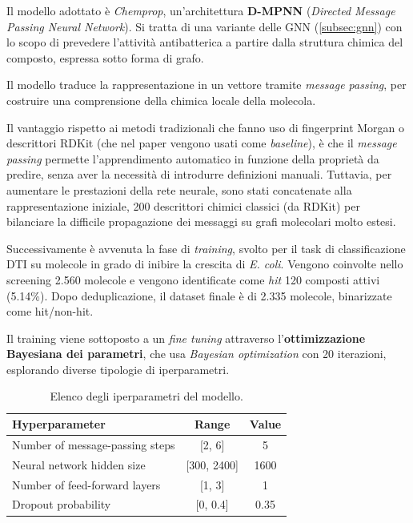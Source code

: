 Il modello adottato è \textit{Chemprop}, un'architettura \textbf{D-MPNN} (\textit{Directed Message Passing Neural Network}). Si tratta di una variante delle GNN (\ref{subsec:gnn}) con lo scopo di prevedere l'attività antibatterica a partire dalla struttura chimica del composto, espressa sotto forma di grafo.

Il modello traduce la rappresentazione in un vettore tramite \textit{message passing}, per costruire una comprensione della chimica locale della molecola.

Il vantaggio rispetto ai metodi tradizionali che fanno uso di fingerprint Morgan o descrittori RDKit (che nel paper vengono usati come \textit{baseline}), è che il \textit{message passing} permette l'apprendimento automatico in funzione della proprietà da predire, senza aver la necessità di introdurre definizioni manuali.
Tuttavia, per aumentare le prestazioni della rete neurale, sono stati concatenate alla rappresentazione iniziale, 200 descrittori chimici classici (da RDKit) per bilanciare la difficile propagazione dei messaggi su grafi molecolari molto estesi.

Successivamente è avvenuta la fase di \textit{training}, svolto per il task di classificazione DTI su molecole in grado di inibire la crescita di \textit{E. coli}. Vengono coinvolte nello screening 2.560 molecole e vengono identificate come \textit{hit} 120 composti attivi (5.14\%).
Dopo deduplicazione, il dataset finale è di 2.335 molecole, binarizzate come hit/non-hit.

Il training viene sottoposto a un \textit{fine tuning} attraverso l'\textbf{ottimizzazione Bayesiana dei parametri}, che usa \textit{Bayesian optimization} con 20 iterazioni, esplorando diverse tipologie di iperparametri.

\begin{table}[ht]
    \centering
    \caption{Elenco degli iperparametri del modello.}
    \label{tab:iperparametri}
    \begin{tabular}{lcc}
        \toprule
        \textbf{Hyperparameter} & \textbf{Range} & \textbf{Value} \\
        \midrule
        Number of message-passing steps & [2, 6] & 5 \\
        Neural network hidden size      & [300, 2400] & 1600 \\
        Number of feed-forward layers   & [1, 3] & 1 \\
        Dropout probability             & [0, 0.4] & 0.35 \\
        \bottomrule
    \end{tabular}
\end{table}

